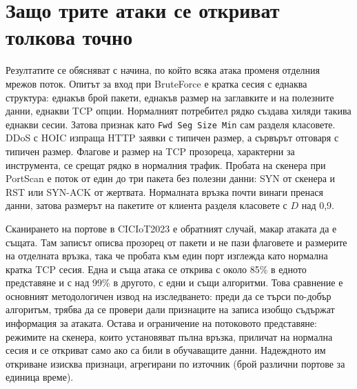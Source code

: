 \section{Защо трите атаки се откриват толкова точно}
Резултатите се обясняват с начина, по който всяка атака променя отделния мрежов поток. Опитът за вход при BruteForce е кратка сесия с еднаква структура: еднакъв брой пакети, еднакъв размер на заглавките и на полезните данни, еднакви TCP опции. Нормалният потребител рядко създава хиляди такива еднакви сесии. Затова признак като \texttt{Fwd Seg Size Min} сам разделя класовете. DDoS с HOIC изпраща HTTP заявки с типичен размер, а сървърът отговаря с типичен размер. Флагове и размер на TCP прозореца, характерни за инструмента, се срещат рядко в нормалния трафик. Пробата на скенера при PortScan е поток от един до три пакета без полезни данни: SYN от скенера и RST или SYN-ACK от жертвата. Нормалната връзка почти винаги пренася данни, затова размерът на пакетите от клиента разделя класовете с $D$ над 0,9.

Сканирането на портове в CICIoT2023 е обратният случай, макар атаката да е същата. Там записът описва прозорец от пакети и не пази флаговете и размерите на отделната връзка, така че пробата към един порт изглежда като нормална кратка TCP сесия. Една и съща атака се открива с около 85\% в едното представяне и с над 99\% в другото, с едни и същи алгоритми. Това сравнение е основният методологичен извод на изследването: преди да се търси по-добър алгоритъм, трябва да се провери дали признаците на записа изобщо съдържат информация за атаката. Остава и ограничение на потоковото представяне: режимите на скенера, които установяват пълна връзка, приличат на нормална сесия и се откриват само ако са били в обучаващите данни. Надеждното им откриване изисква признаци, агрегирани по източник (брой различни портове за единица време).

